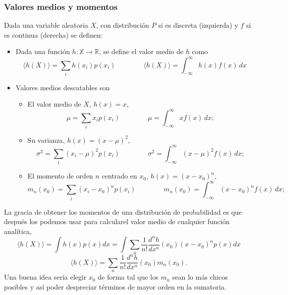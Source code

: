 \subsubsection{Valores medios y momentos}
\begin{definition}
    Dada una variable aleatoria $X$, con distribución $P$ si es discreta (izquierda) y $f$ si es continua (derecha) se definen:
    \begin{itemize}
        \item Dada una función $h:\mathbb{X}\to \mathbb{R}$, se define el valor medio de $h$ como
        \begin{equation}
\langle h(X) \rangle = \sum_{i} h(x_i) p(x_i)
\qquad \qquad 
\langle h(X) \rangle = \int_{-\infty}^{\infty} h(x) f(x) \, dx
        \end{equation}
        \item Valores medios descatables son
        \begin{itemize}
            \item El valor medio de $X$, $h(x)=x$,
            \begin{equation}
                \mu = \sum_{i} x_i p(x_i)
                \qquad \qquad 
                \mu = \int_{-\infty}^{\infty} x f(x) \, dx;
            \end{equation}
            \item Su varianza, $h(x)=(x-\mu)^2$,
            \begin{equation}
                \sigma^2 = \sum_{i} (x_i-\mu)^2 p(x_i)
                \qquad \qquad 
                \sigma^2 = \int_{-\infty}^{\infty} (x-\mu)^2 f(x) \, dx;
            \end{equation}
            \item El momento de orden $n$ centrado en $x_0$, $h(x) = (x-x_0)^n$,
            \begin{equation}
                m_n(x_0) = \sum_{i} (x_i-x_0)^n p(x_i)
                \qquad \qquad 
                m_n(x_0) = \int_{-\infty}^{\infty} (x-x_0)^n f(x) \, dx;
            \end{equation}
        \end{itemize}
    \end{itemize}
\end{definition}
La gracia de obtener los momentos de una distribución de probabilidad es que después los podemos usar para calcularel valor medio de cualquier función analítica,
\begin{equation}
    \langle h(X)\rangle =
    \int h(x) p(x) dx = \int \sum_n \frac{1}{n!}\frac{d^nh}{dx^n}(x_0)(x-x_0)^n p(x)dx 
\end{equation}
\begin{equation}
    \langle h(X)\rangle =\sum_n\frac{1}{n!}\frac{d^nh}{dx^n}(x_0)m_n(x_0).
\end{equation}
Una buena idea sería elegir $x_0$ de forma tal que los $m_n$ sean lo más chicos posibles y así poder despreciar términos de mayor orden en la sumatoria.